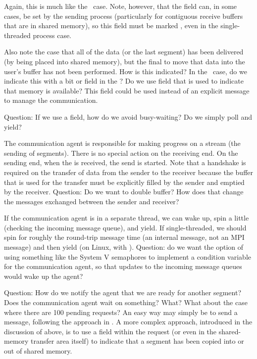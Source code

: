 
Again, this is much like the \tcpname\ case.  Note, however, that the
 field can, in some cases, be set by the
sending process (particularly for contiguous receive buffers that are in
shared memory), so this field must be marked , even in the
single-threaded process case.

Also note the case that all of the data (or the last segment) has been
delivered (by being placed 
into shared memory), but the final  to move that data
into the user's buffer has not been performed.  How is this indicated?  
In the \shmemname\ case, do we indicate
this with a bit or field in the ?  Do we use  field that is used to indicate
that memory is available?  This field could be used instead of an explicit
message to manage the communication.  

Question: If we use a  field, how do we avoid
busy-waiting?  Do we simply poll and yield?


The communication agent is responsible for making progress on a stream (the
sending of segments).  There is no special action on the receiving end.  On
the sending end, when the  is received, the
send is started.  Note that a handshake is required on the transfer of data
from the sender to the receiver because the buffer that is used for the
transfer must be explicitly filled by the sender and emptied by the receiver.
Question: Do we want to double buffer?  How does that change the messages
exchanged between the sender and receiver?

If the communication agent is in a separate thread, we can wake up, spin a
little (checking the incoming message queue), and yield.  If single-threaded,
we should spin for roughly the round-trip message time (an internal message,
not an MPI message) and then yield (on Linux, with ).
Question: do we want the option of using something like the System V
semaphores to implement a condition variable for the communication agent, so
that updates to the incoming message queues would wake up the agent?

Question: How do we notify the agent that we are ready for another segment?
Does the communication agent wait on something?  What?  What about the case
where there are 100 pending requests?
An easy way may simply be to send a message, following the approach in
\tcpname.  A more complex approach, introduced in the discussion of
 above, is to use a field within the request (or even in the
shared-memory transfer area itself) to indicate that a segment has been copied
into or out of shared memory.  

